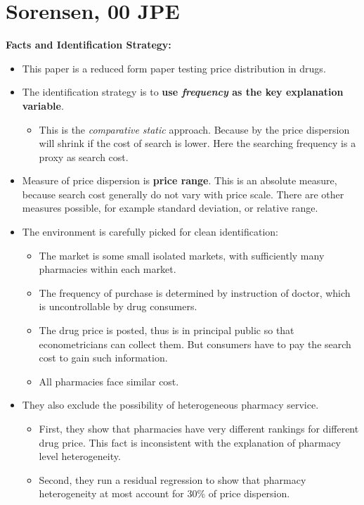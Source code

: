 \documentclass{book}
\theoremstyle{plain}
\theoremstyle{definition}
\begin{document}
\section{Sorensen, 00 JPE} %
\label{sec:sorensen_00_jpe}

\textbf{}

\vspace{1em}
\noindent
\textbf{Facts and Identification Strategy:}
\begin{itemize}
	\item This paper is a reduced form paper testing price distribution in drugs.

	\item The identification strategy is to \textbf{use \textit{frequency} as the key explanation variable}. 
	\begin{itemize}
		\item This is the \textit{comparative static} approach. Because by \cite{butters:77res} the price dispersion will shrink if the cost of search is lower. Here the searching frequency is a proxy as search cost.
	\end{itemize}
	
	\item Measure of price dispersion is \textbf{price range}. This is an absolute measure, because search cost generally do not vary with price scale. There are other measures possible, for example standard deviation, or relative range.

	\item The environment is carefully picked for clean identification:
	\begin{itemize}
		\item The market is some small isolated markets, with sufficiently many pharmacies within each market.
		\item The frequency of purchase is determined by instruction of doctor, which is uncontrollable by drug consumers.
		\item The drug price is posted, thus is in principal public so that econometricians can collect them. But consumers have to pay the search cost to gain such information.
		\item All pharmacies face similar cost.
	\end{itemize}

	\item They also exclude the possibility of heterogeneous pharmacy service.
	\begin{itemize}
		\item First, they show that pharmacies have very different rankings for different drug price. This fact is inconsistent with the explanation of pharmacy level heterogeneity.
		\item Second, they run a residual regression to show that pharmacy heterogeneity at most account for 30\% of price dispersion.
	\end{itemize}
\end{itemize}
\end{document}
